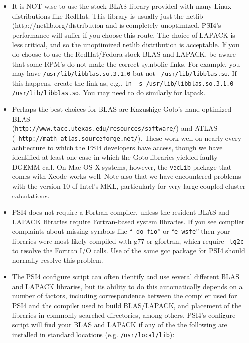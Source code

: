 \documentclass[12pt]{article}
\begin{document}
\begin{itemize}
\item It is NOT wise to use the stock BLAS library provided with many
  Linux distributions like RedHat.  This library is usually just the
  netlib ({http://netlib.org/}distribution and is completely
  unoptimized.  PSI4's performance will suffer if you choose this
  route.  The choice of LAPACK is less critical, and so the
  unoptimized netlib distribution is acceptable.  If you do choose to
  use the RedHat/Fedora stock BLAS and LAPACK, be aware that some
  RPM's do not make the correct symbolic links.  For example, you may
  have {\tt /usr/lib/libblas.so.3.1.0} but not {\tt
    /usr/lib/libblas.so}.  If this happens, create the link as, e.g.,
  {\tt ln -s /usr/lib/libblas.so.3.1.0 /usr/lib/libblas.so}.  You may
  need to do similarly for lapack.

\item Perhaps the best choices for BLAS are Kazushige Goto's
  hand-optimized BLAS \\
({\tt http://www.tacc.utexas.edu/resources/software/}) and ATLAS \\ ({\tt
http://math-atlas.sourceforge.net/}).  These work well on nearly
  every achitecture to which the PSI4 developers have access, though we have
  identified at least one case in which the Goto libraries yielded faulty
  DGEMM call.  On Mac OS X systems, however, the {\tt vecLib} package that
  comes with Xcode works well. Note also that we have encountered problems
with the  version 10 of Intel's MKL, particularly for very large coupled
cluster  calculations.

\item PSI4 does not require a Fortran compiler, unless the resident
  BLAS and LAPACK libraries require Fortran-based system libraries.
  If you see compiler complaints about missing symbols like ``{\tt
    do\_fio}'' or ``{\tt e\_wsfe}'' then your libraries were most likely
  compiled with g77 or gfortran, which require {\tt -lg2c} to resolve
  the Fortran I/O calls.  Use of the same gcc package for PSI4 should
  normally resolve this problem.

\item The PSI4 configure script can often identify and use
  several different BLAS and LAPACK libraries, but its ability to do
  this automatically depends on a number of factors, including
  correspondence between the compiler used for PSI4 and the compiler
  used to build BLAS/LAPACK, and placement of the libraries in
  commonly searched directories, among others.  PSI4's configure
  script will find your BLAS and LAPACK if any of the the following
  are installed in standard locations (e.g. {\tt /usr/local/lib}):


\end{itemize}
\end{document}
